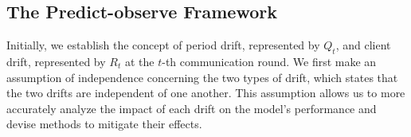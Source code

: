 
\subsection{The Predict-observe Framework}
Initially, we establish the concept of period drift, represented by $Q_t$, and client drift, represented by $R_t$ at the $t$-th communication round. We first make an assumption of independence concerning the two types of drift, which states that the two drifts are independent of one another. This assumption allows us to more accurately analyze the impact of each drift on the model's performance and devise methods to mitigate their effects.

